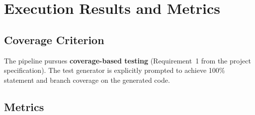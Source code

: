 \documentclass[12pt, a4paper]{article}
\begin{document}



\section{Execution Results and Metrics}
\label{sec:results}

\subsection{Coverage Criterion}

The pipeline pursues \textbf{coverage-based testing} (Requirement~1 from the
project specification). The test generator is explicitly prompted to achieve 100\%
statement and branch coverage on the generated code.

\subsection{Metrics}
\end{document}

